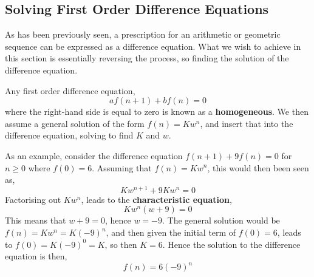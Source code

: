     \subsection{Solving First Order Difference Equations}
        As has been previously seen, a prescription for an arithmetic or geometric sequence can be expressed as a 
        difference equation. What we wish to achieve in this section is essentially reversing the process, so finding 
        the solution of the difference equation.
        \par \hfill \break
        Any first order difference equation,
        \begin{equation}
            af(n+1) + bf(n) = 0
        \end{equation}
        where the right-hand side is equal to zero is known as a \textbf{homogeneous}. We then assume a general solution 
        of the form \(f(n) = Kw^n\), and insert that into the difference equation, solving to find \(K\) and \(w\).
        \par \hfill \break
        As an example, consider the difference equation \(f(n+1) + 9f(n) = 0\) for \(n \geq 0\) where \(f(0)=6\). Assuming 
        that \(f(n) = Kw^n\), this would then been seen as,
        \begin{equation}
            Kw^{n+1} + 9Kw^n = 0
        \end{equation}
        Factorising out \(Kw^n\), leads to the \textbf{characteristic equation},
        \begin{equation}
            Kw^n (w+9)=0
        \end{equation}
        This means that \(w+9=0\), hence \(w=-9\). The general solution would be \(f(n) = Kw^n = K(-9)^n\), and then 
        given the initial term of \(f(0) = 6\), leads to \(f(0) = K(-9)^0 = K\), so then \(K=6\). Hence the solution 
        to the difference equation is then,
        \begin{equation}
            f(n) = 6(-9)^n
        \end{equation}

